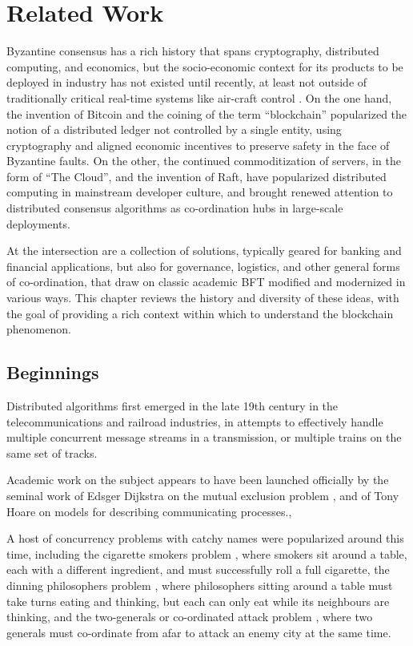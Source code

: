 \chapter{Related Work}
\label{ch:related}

Byzantine consensus has a rich history that spans cryptography, distributed computing, and economics,
but the socio-economic context for its products to be deployed in industry has not existed until recently,
at least not outside of traditionally critical real-time systems like air-craft control \cite{draper_lab}.
On the one hand, the invention of Bitcoin and the coining of the term ``blockchain'' popularized the notion
of a distributed ledger not controlled by a single entity, using cryptography and aligned economic incentives to 
preserve safety in the face of Byzantine faults.
On the other, the continued commoditization of servers, in the form of ``The Cloud'', and the invention of Raft, 
have popularized distributed computing in mainstream developer culture, 
and brought renewed attention to distributed consensus algorithms as co-ordination hubs in large-scale deployments. 

At the intersection are a collection of solutions, typically geared for banking and financial applications,
but also for governance, logistics, and other general forms of co-ordination, 
that draw on classic academic BFT modified and modernized in various ways.
This chapter reviews the history and diversity of these ideas, with the goal of providing a rich context within which to 
understand the blockchain phenomenon.

\section{Beginnings}

Distributed algorithms first emerged in the late 19th century in the telecommunications and railroad industries,
in attempts to effectively handle multiple concurrent message streams in a transmission, 
or multiple trains on the same set of tracks.

Academic work on the subject appears to have been launched officially by the seminal work
of Edsger Dijkstra on the mutual exclusion problem \cite{mutex}, and of Tony Hoare on models for describing communicating processes.\cite{csp}, 

A host of concurrency problems with catchy names were popularized around this time,
including the cigarette smokers problem \cite{cigarette_smokers}, where smokers sit around a table, 
each with a different ingredient, and must successfully roll a full cigarette,
the dinning philosophers problem \cite{dining_philosophers},
where philosophers sitting around a table must take turns eating and thinking,
but each can only eat while its neighbours are thinking,
and the two-generals or co-ordinated attack problem \cite{gettier},
where two generals must co-ordinate from afar to attack an enemy city at the same time.

